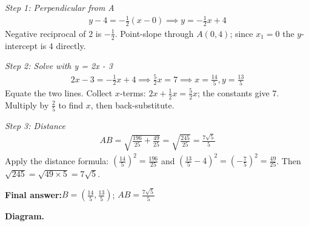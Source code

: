 \documentclass[11pt]{article}
\begin{document}
\textit{Step 1: Perpendicular from A}
\[\begin{gathered}
y - 4 = -\frac{1}{2}(x - 0) \implies y = -\frac{1}{2}x + 4
\end{gathered}\]
Negative reciprocal of \( 2 \) is \( -\tfrac{1}{2} \). Point-slope through \( A(0, 4) \); since \( x_1 = 0 \) the \( y \)-intercept is \( 4 \) directly.

\textit{Step 2: Solve with y = 2x - 3}
\[\begin{gathered}
2x - 3 = -\frac{1}{2}x + 4 \implies \frac{5}{2}x = 7 \implies x = \frac{14}{5}, y = \frac{13}{5}
\end{gathered}\]
Equate the two lines. Collect \( x \)-terms: \( 2x + \tfrac{1}{2}x = \tfrac{5}{2}x \); the constants give \( 7 \). Multiply by \( \tfrac{2}{5} \) to find \( x \), then back-substitute.

\textit{Step 3: Distance}
\[\begin{gathered}
AB = \sqrt{\frac{196}{25} + \frac{49}{25}} = \sqrt{\frac{245}{25}} = \frac{7\sqrt{5}}{5}
\end{gathered}\]
Apply the distance formula: \( \left(\tfrac{14}{5}\right)^2 = \tfrac{196}{25} \) and \( \left(\tfrac{13}{5} - 4\right)^2 = \left(-\tfrac{7}{5}\right)^2 = \tfrac{49}{25} \). Then \( \sqrt{245} = \sqrt{49 \times 5} = 7\sqrt{5} \).

\begin{answerbox}
\textbf{Final answer:}\quad \(\displaystyle B = \left(\frac{14}{5}, \frac{13}{5}\right)\); \(\displaystyle AB = \frac{7\sqrt{5}}{5}\)
\end{answerbox}
\textbf{Diagram.}
\end{document}
